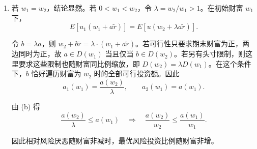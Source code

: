 \begin{solution}[label-content={证明},blank-type=manual,blank-vsep=11\baselineskip]
\begin{enumerate}[label=(\alph*)]
\item 若 $w_1=w_2$，结论显然。若 $0<w_1<w_2$，令 $\lambda=w_2/w_1>1$。在初始财富 $w_1$ 下，
\[
 E[u_1(w_1+a\tilde r)]
 =E[u(w_2+\lambda a\tilde r)].
\]

令 $b=\lambda a$，则 $w_2+b\tilde r=\lambda\cdot(w_1+a\tilde r)$。若可行性只要求期末财富为正，两边同时为正，故 $a\in D(w_1)$ 当且仅当 $b\in D(w_2)$。若另有头寸限制，则这里要求这些限制也随财富同比例缩放，即 $D(w_2)=\lambda D(w_1)$。在这个条件下，$b$ 恰好遍历财富为 $w_2$ 时的全部可行投资额。因此
\[
 a_1(w_1)=\frac{a(w_2)}{\lambda},\qquad a_2(w_1)=a(w_1).
\]

由 (b) 得
\[
 \frac{a(w_2)}{\lambda}\le a(w_1)
 \quad\Longrightarrow\quad
 \boxed{\frac{a(w_2)}{w_2}\le\frac{a(w_1)}{w_1}}.
\]

因此相对风险厌恶随财富非减时，最优风险投资比例随财富非增。
\end{enumerate}
\end{solution}

